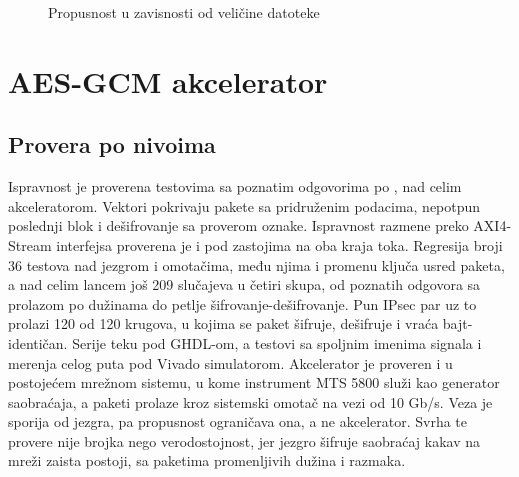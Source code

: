 \begin{figure}[H]
\centering
{}
\caption{Propusnost u zavisnosti od veličine datoteke}
\label{fig:sha3_rezija}
\end{figure}

\section{AES-GCM akcelerator}
\label{sec:rez_aes}

\subsection{Provera po nivoima}
\label{subsec:rez_aes_provera}

Ispravnost je proverena testovima sa poznatim odgovorima po \cite{sp80038d}, nad celim akceleratorom. Vektori pokrivaju pakete sa pridruženim podacima, nepotpun poslednji blok i dešifrovanje sa proverom oznake. Ispravnost razmene preko AXI4-Stream interfejsa proverena je i pod zastojima na oba kraja toka. Regresija broji 36 testova nad jezgrom i omotačima, među njima i promenu ključa usred paketa, a nad celim lancem još 209 slučajeva u četiri skupa, od poznatih odgovora sa prolazom po dužinama do petlje šifrovanje-dešifrovanje. Pun IPsec par uz to prolazi 120 od 120 krugova, u kojima se paket šifruje, dešifruje i vraća bajt-identičan. Serije teku pod GHDL-om, a testovi sa spoljnim imenima signala i merenja celog puta pod Vivado simulatorom.
\smallbreak
Akcelerator je proveren i u postojećem mrežnom sistemu, u kome instrument MTS 5800 služi kao generator saobraćaja, a paketi prolaze kroz sistemski omotač na vezi od 10 Gb/s. Veza je sporija od jezgra, pa propusnost ograničava ona, a ne akcelerator. Svrha te provere nije brojka nego verodostojnost, jer jezgro šifruje saobraćaj kakav na mreži zaista postoji, sa paketima promenljivih dužina i razmaka.

